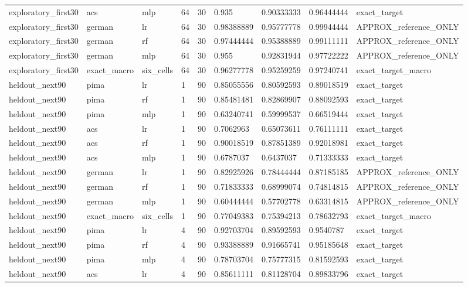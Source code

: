 \begin{tabular}{lllllllll}
exploratory\_first30 & acs & mlp & 64 & 30 & 0.935 & 0.90333333 & 0.96444444 & exact\_target \\
exploratory\_first30 & german & lr & 64 & 30 & 0.98388889 & 0.95777778 & 0.99944444 & APPROX\_reference\_ONLY \\
exploratory\_first30 & german & rf & 64 & 30 & 0.97444444 & 0.95388889 & 0.99111111 & APPROX\_reference\_ONLY \\
exploratory\_first30 & german & mlp & 64 & 30 & 0.955 & 0.92831944 & 0.97722222 & APPROX\_reference\_ONLY \\
exploratory\_first30 & exact\_macro & six\_cells & 64 & 30 & 0.96277778 & 0.95259259 & 0.97240741 & exact\_target\_macro \\
heldout\_next90 & pima & lr & 1 & 90 & 0.85055556 & 0.80592593 & 0.89018519 & exact\_target \\
heldout\_next90 & pima & rf & 1 & 90 & 0.85481481 & 0.82869907 & 0.88092593 & exact\_target \\
heldout\_next90 & pima & mlp & 1 & 90 & 0.63240741 & 0.59999537 & 0.66519444 & exact\_target \\
heldout\_next90 & acs & lr & 1 & 90 & 0.7062963 & 0.65073611 & 0.76111111 & exact\_target \\
heldout\_next90 & acs & rf & 1 & 90 & 0.90018519 & 0.87851389 & 0.92018981 & exact\_target \\
heldout\_next90 & acs & mlp & 1 & 90 & 0.6787037 & 0.6437037 & 0.71333333 & exact\_target \\
heldout\_next90 & german & lr & 1 & 90 & 0.82925926 & 0.78444444 & 0.87185185 & APPROX\_reference\_ONLY \\
heldout\_next90 & german & rf & 1 & 90 & 0.71833333 & 0.68999074 & 0.74814815 & APPROX\_reference\_ONLY \\
heldout\_next90 & german & mlp & 1 & 90 & 0.60444444 & 0.57702778 & 0.63314815 & APPROX\_reference\_ONLY \\
heldout\_next90 & exact\_macro & six\_cells & 1 & 90 & 0.77049383 & 0.75394213 & 0.78632793 & exact\_target\_macro \\
heldout\_next90 & pima & lr & 4 & 90 & 0.92703704 & 0.89592593 & 0.9540787 & exact\_target \\
heldout\_next90 & pima & rf & 4 & 90 & 0.93388889 & 0.91665741 & 0.95185648 & exact\_target \\
heldout\_next90 & pima & mlp & 4 & 90 & 0.78703704 & 0.75777315 & 0.81592593 & exact\_target \\
heldout\_next90 & acs & lr & 4 & 90 & 0.85611111 & 0.81128704 & 0.89833796 & exact\_target \\

\end{tabular}
